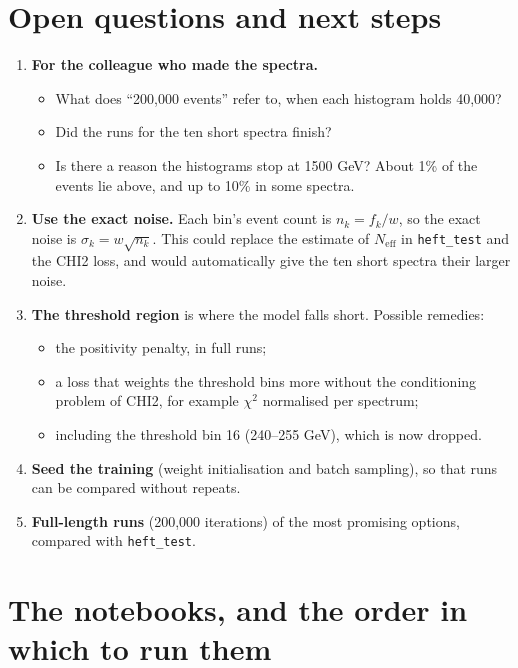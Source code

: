 \documentclass[11pt]{article}
\newcommand{\code}[1]{\texttt{#1}}
\newcommand{\neff}{N_\text{eff}}
\begin{document}
\section{Open questions and next steps}
\label{sec:next}

\begin{enumerate}
  \item \textbf{For the colleague who made the spectra.}
  \begin{itemize}
    \item What does ``200,000 events'' refer to, when each histogram holds 40,000?
    \item Did the runs for the ten short spectra finish?
    \item Is there a reason the histograms stop at 1500 GeV? About 1\% of the events lie
    above, and up to 10\% in some spectra.
  \end{itemize}
  \item \textbf{Use the exact noise.} Each bin's event count is $n_k = f_k/w$, so the
  exact noise is $\sigma_k = w\sqrt{n_k}$. This could replace the estimate of $\neff$ in
  \code{heft\_test} and the CHI2 loss, and would automatically give the ten short spectra
  their larger noise.
  \item \textbf{The threshold region} is where the model falls short. Possible remedies:
  \begin{itemize}
    \item the positivity penalty, in full runs;
    \item a loss that weights the threshold bins more without the conditioning problem of
    CHI2, for example $\chi^2$ normalised per spectrum;
    \item including the threshold bin 16 (240--255 GeV), which is now dropped.
  \end{itemize}
  \item \textbf{Seed the training} (weight initialisation and batch sampling), so that
  runs can be compared without repeats.
  \item \textbf{Full-length runs} (200,000 iterations) of the most promising options,
  compared with \code{heft\_test}.
\end{enumerate}

\appendix
\section{The notebooks, and the order in which to run them}
\end{document}

